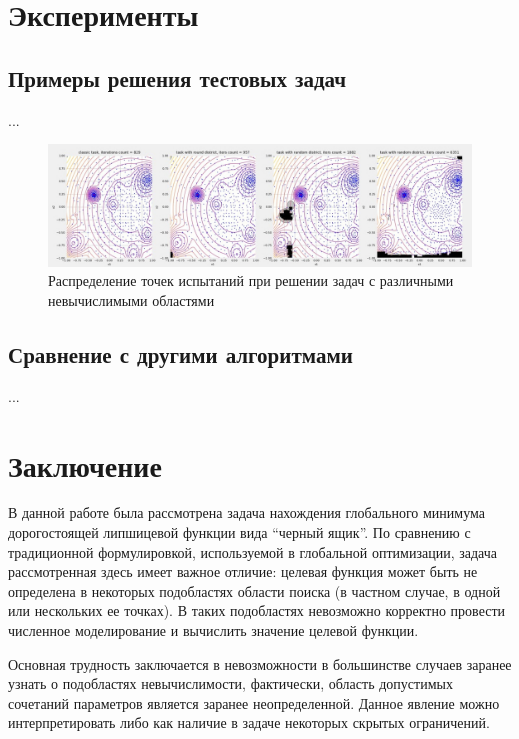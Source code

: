 \documentclass[10pt,a4paper]{book}
\begin{document}
\section{Эксперименты}

\subsection{Примеры решения тестовых задач}

...

\begin{figure}[h]
\includegraphics[width=450pt]{pic/fig_2.jpg}
\caption{Распределение точек испытаний при решении задач с различными невычислимыми областями} \label{fig_2}
\end{figure}

\subsection{Сравнение с другими алгоритмами}

...

\section{Заключение}

В данной работе была рассмотрена задача нахождения глобального минимума дорогостоящей липшицевой функции вида ``черный ящик''. По сравнению с традиционной формулировкой, используемой в глобальной оптимизации, задача рассмотренная здесь имеет важное отличие: целевая функция может быть не определена в некоторых подобластях области поиска (в частном случае, в одной или нескольких ее точках). В таких подобластях невозможно корректно провести численное моделирование и вычислить значение целевой функции.

Основная трудность заключается в невозможности в большинстве случаев заранее узнать о подобластях невычислимости, фактически, область допустимых сочетаний параметров является заранее неопределенной. Данное явление можно интерпретировать либо как наличие в задаче некоторых скрытых ограничений.
\end{document}

